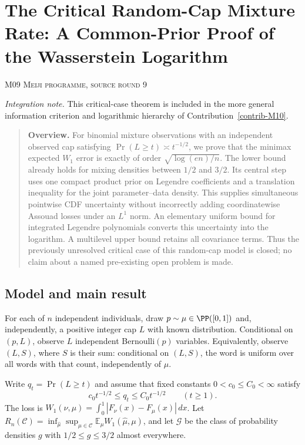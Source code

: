 \documentclass[11pt,a4paper]{article}
\theoremstyle{definition}\newtheorem{definition}[theorem]{Definition}
\theoremstyle{remark}\newtheorem{remark}[theorem]{Remark}
\newcommand{\E}{\mathbb E}\newcommand{\one}{\mathbf 1}\newcommand{\1}{\mathbf 1}
\numberwithin{equation}{section}
\begin{document}
\clearpage
\section[M09 --- The Critical Random-Cap Mixture Rate: A Common-Prior Proof of the Wasserstein Logarithm]{The Critical Random-Cap Mixture Rate: A Common-Prior Proof of the Wasserstein Logarithm}\label{contrib-M09}
\noindent\textsc{M09 \quad Meiji programme, source round 9}\par\medskip
\noindent\textit{Integration note.} This critical-case theorem is included in the more general information criterion and logarithmic hierarchy of Contribution~\ref{contrib-M10}.\par\medskip


\begin{quote}\small\textbf{Overview.} For binomial mixture observations with an independent observed cap satisfying $\Pr(L\ge t)\asymp t^{-1/2}$, we prove that the minimax expected $W_1$ error is exactly of order $\sqrt{\log(en)/n}$. The lower bound already holds for mixing densities between $1/2$ and $3/2$. Its central step uses one compact product prior on Legendre coefficients and a translation inequality for the joint parameter--data density. This supplies simultaneous pointwise CDF uncertainty without incorrectly adding coordinatewise Assouad losses under an $L^1$ norm. An elementary uniform bound for integrated Legendre polynomials converts this uncertainty into the logarithm. A multilevel upper bound retains all covariance terms. Thus the previously unresolved critical case of this random-cap model is closed; no claim about a named pre-existing open problem is made.\end{quote}

\subsection{Model and main result}\label{M09-sec-1}
For each of $n$ independent individuals, draw $p\sim\mu\in\PP([0,1])$ and, independently, a positive integer cap $L$ with known distribution. Conditional on $(p,L)$, observe $L$ independent Bernoulli$(p)$ variables. Equivalently, observe $(L,S)$, where $S$ is their sum: conditional on $(L,S)$, the word is uniform over all words with that count, independently of $\mu$.

Write $q_t=\Pr(L\ge t)$ and assume that fixed constants $0<c_0\le C_0<\infty$ satisfy
\[
 c_0t^{-1/2}\le q_t\le C_0t^{-1/2}\qquad(t\ge1).\tag{M09.1}
\]
The loss is $W_1(\nu,\mu)=\int_0^1|F_\nu(x)-F_\mu(x)|\,dx$. Let $R_n(\mathcal C)=\inf_{\widehat\mu}\sup_{\mu\in\mathcal C}\E_\mu W_1(\widehat\mu,\mu)$, and let $\mathcal G$ be the class of probability densities $g$ with $1/2\le g\le3/2$ almost everywhere.
\end{document}
